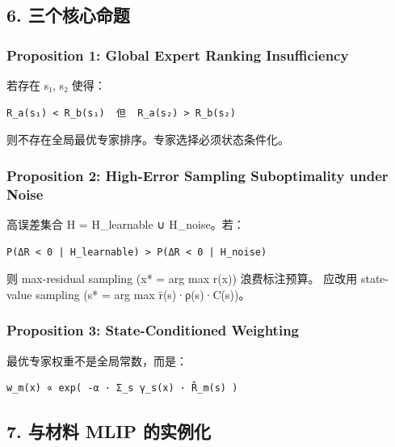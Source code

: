 \documentclass[
  12pt,
]{ctexart}
\begin{document}
\subsection{6. 三个核心命题}\label{ux4e09ux4e2aux6838ux5fc3ux547dux9898}

\subsubsection{Proposition 1: Global Expert Ranking
Insufficiency}\label{proposition-1-global-expert-ranking-insufficiency}

若存在 s₁, s₂ 使得：

\begin{verbatim}
R_a(s₁) < R_b(s₁)  但  R_a(s₂) > R_b(s₂)
\end{verbatim}

则不存在全局最优专家排序。专家选择必须状态条件化。

\subsubsection{Proposition 2: High-Error Sampling Suboptimality under
Noise}\label{proposition-2-high-error-sampling-suboptimality-under-noise}

高误差集合 H = H\_learnable ∪ H\_noise。若：

\begin{verbatim}
P(ΔR < 0 | H_learnable) > P(ΔR < 0 | H_noise)
\end{verbatim}

则 max-residual sampling (x* = arg max r(x)) 浪费标注预算。 应改用
state-value sampling (s* = arg max r̄(s)·ρ(s)·C(s))。

\subsubsection{Proposition 3: State-Conditioned
Weighting}\label{proposition-3-state-conditioned-weighting}

最优专家权重不是全局常数，而是：

\begin{verbatim}
w_m(x) ∝ exp( -α · Σ_s γ_s(x) · R̂_m(s) )
\end{verbatim}

\subsection{7. 与材料 MLIP
的实例化}\label{ux4e0eux6750ux6599-mlip-ux7684ux5b9eux4f8bux5316}
\end{document}
